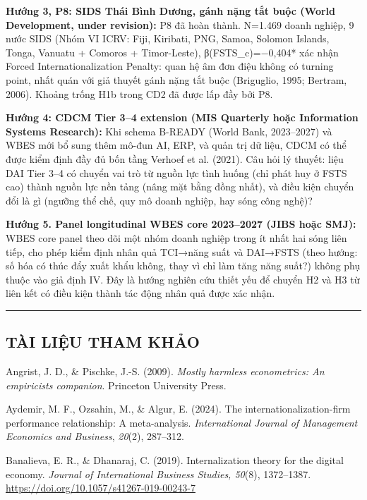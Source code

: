 \documentclass[12pt,a4paper]{article}
\begin{document}
\textbf{Hướng 3, P8: SIDS Thái Bình Dương, gánh nặng tắt buộc (World
Development, under revision):} P8 đã hoàn thành. N=1.469 doanh nghiệp, 9
nước SIDS (Nhóm VI ICRV: Fiji, Kiribati, PNG, Samoa, Solomon Islands,
Tonga, Vanuatu + Comoros + Timor-Leste), β(FSTS\_c)=−0,404* xác nhận
Forced Internationalization Penalty: quan hệ âm đơn điệu không có
turning point, nhất quán với giả thuyết gánh nặng tắt buộc (Briguglio,
1995; Bertram, 2006). Khoảng trống H1b trong CD2 đã được lấp đầy bởi P8.

\textbf{Hướng 4: CDCM Tier 3--4 extension (MIS Quarterly hoặc
Information Systems Research):} Khi schema B-READY (World Bank,
2023--2027) và WBES mới bổ sung thêm mô-đun AI, ERP, và quản trị dữ
liệu, CDCM có thể được kiểm định đầy đủ bốn tầng Verhoef et al. (2021).
Câu hỏi lý thuyết: liệu DAI Tier 3--4 có chuyển vai trò từ nguồn lực
tình huống (chỉ phát huy ở FSTS cao) thành nguồn lực nền tảng (nâng mặt
bằng đồng nhất), và điều kiện chuyển đổi là gì (ngưỡng thể chế, quy mô
doanh nghiệp, hay sóng công nghệ)?

\textbf{Hướng 5. Panel longitudinal WBES core 2023--2027 (JIBS hoặc
SMJ):} WBES core panel theo dõi một nhóm doanh nghiệp trong ít nhất hai
sóng liên tiếp, cho phép kiểm định nhân quả TCI→năng suất và DAI→FSTS
(theo hướng: số hóa có thúc đẩy xuất khẩu không, thay vì chỉ làm tăng
năng suất?) không phụ thuộc vào giả định IV. Đây là hướng nghiên cứu
thiết yếu để chuyển H2 và H3 từ liên kết có điều kiện thành tác động
nhân quả được xác nhận.

\begin{center}\rule{0.5\linewidth}{0.5pt}\end{center}

\hypertarget{tuxe0i-liux1ec7u-tham-khux1ea3o}{%
\subsection{TÀI LIỆU THAM KHẢO}\label{tuxe0i-liux1ec7u-tham-khux1ea3o}}

Angrist, J. D., \& Pischke, J.-S. (2009). \emph{Mostly harmless
econometrics: An empiricist\textquotesingle s companion}. Princeton
University Press.

Aydemir, M. F., Ozsahin, M., \& Algur, E. (2024). The
internationalization-firm performance relationship: A meta-analysis.
\emph{International Journal of Management Economics and Business},
\emph{20}(2), 287--312.

Banalieva, E. R., \& Dhanaraj, C. (2019). Internalization theory for the
digital economy. \emph{Journal of International Business Studies,
50}(8), 1372--1387. \url{https://doi.org/10.1057/s41267-019-00243-7}
\end{document}
